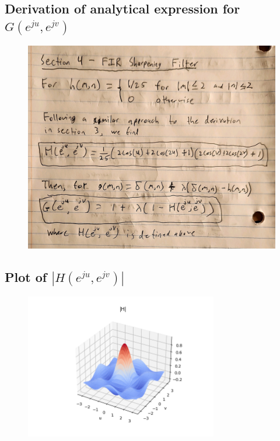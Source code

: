 \documentclass{article}
\begin{document}
\subsection{Derivation of analytical expression for $G(e^{ju}, e^{jv})$}
\begin{figure}[H]
    \centering
    \includegraphics[width=1\textwidth]{../results/ece637-lab1_2.jpg}
    \begin{center}
    \end{center}
\end{figure}
\subsection{Plot of $|H(e^{ju}, e^{jv})|$}
\begin{figure}[H]
    \centering
    \includegraphics[width=0.75\textwidth]{../results/section4-H-python.png}
    \begin{center}
    \end{center}
\end{figure}
\end{document}
